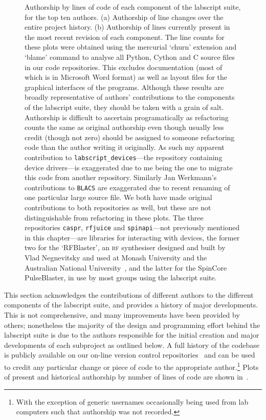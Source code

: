 \begin{figure}
    \caption{Authorship by lines of code of each component of the labscript suite, for the top ten authors. (a) Authorship of line changes over the entire project history. (b) Authorship of lines currently present in the most recent revision of each component. The line counts for these plots were obtained using the mercurial `churn' extension and `blame' command to analyse all Python, Cython and C source files in our code repositories. This excludes documentation (most of which is in Microsoft Word format) as well as layout files for the graphical interfaces of the programs. Although these results are broadly representative of authors' contributions to the components of the labscript suite, they should be taken with a grain of salt. Authorship is difficult to ascertain programatically as refactoring counts the same as original authorship even though usually less credit (though not zero) should be assigned to someone refactoring code than the author writing it originally. As such my apparent contribution to \texttt{labscript\_devices}---the repository containing device drivers---is exaggerated due to me being the one to migrate this code from another repository. Similarly Jan Werkmann's contributions to \texttt{BLACS} are exaggerated due to recent renaming of one particular large source file. We both have made original contributions to both repositories as well, but these are not distinguishable from refactoring in these plots. The three repositories \texttt{caspr}, \texttt{rfjuice} and \texttt{spinapi}---not previously mentioned in this chapter---are libraries for interacting with devices, the former two for the `RFBlaster', an \textsc{rf} synthesiser designed and built by Vlad Negnevitsky and used at Monash University and the Australian National University~\cite{altin_precision_2013}, and the latter for the SpinCore PulseBlaster, in use by most groups using the labscript suite.}\label{fig:line_counts}
\end{figure}

This section acknowledges the contributions of different authors to the different components of the labscript suite, and provides a history of major developments. This is not comprehensive, and many improvements have been provided by others; nonetheless the majority of the design and programming effort behind the labscript suite is due to the authors responsible for the initial creation and major developments of each subproject as outlined below. A full history of the codebase is publicly available on our on-line version control repositories~\cite{monash_univeristy_labscript_2018, starkey_qtutils_2018, billington_zprocess_2018} and can be used to credit any particular change or piece of code to the appropriate author.\footnote{With the exception of generic usernames occasionally being used from lab computers such that authorship was not recorded.} Plots of present and historical authorship by number of lines of code are shown in~.

